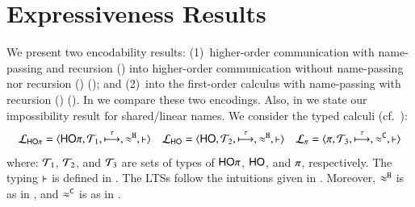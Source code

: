 \documentclass[runningheads]{llncs}
\begin{document}
{%

\section{Expressiveness Results}
\label{sec:positive}
%
 We present two encodability results:
(1)~higher-order communication with name-passing and recursion (\HOp) into 
higher-order communication without name-passing nor recursion (\HO) (); and 
(2)~\HOp into the first-order calculus with name-passing  
with recursion (\sessp) ().
In  we compare these two encodings. 
Also, in  we state our impossibility result for shared/linear names.
We consider the typed calculi (cf.~):
	$$\mathcal{L}_{\mathsf{HO}\pi}=\langle \mathsf{HO}\pi, {\cal{T}}_1, \stackrel{\tau}{\longmapsto}, \approx^\mathtt{H}, \vdash \rangle
	\quad
	\mathcal{L}_{\mathsf{HO}}=\langle \mathsf{HO}, {\cal{T}}_2, \stackrel{\tau}{\longmapsto}, \approx^\mathtt{H}, \vdash \rangle
	\quad
	\mathcal{L}_{\pi}=\langle \pi, {\cal{T}}_3, \stackrel{\tau}{\longmapsto}, \approx^\mathtt{C}, \vdash \rangle$$
where: 
${\cal{T}}_1$, ${\cal{T}}_2$, 
and ${\cal{T}}_3$
are sets of types of $\mathsf{HO}\pi$, $\mathsf{HO}$, and $\pi$, respectively. 
The typing $\vdash$ is defined in 
.
The LTSs follow the intuitions given in .
Moreover, 
$\approx^\mathtt{H}$ is as in , and 
$\approx^\mathtt{C}$ is as in .


}
\end{document}
